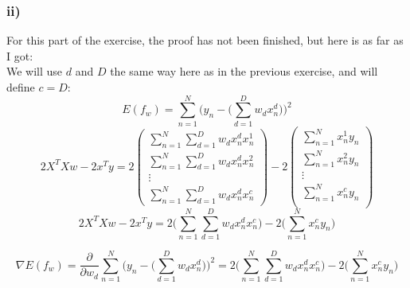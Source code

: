 \subsubsection{ii)}
For this part of the exercise, the proof has not been finished, but here is as far as I got:\\
We will use $d$ and $D$ the same way here as in the previous exercise, and will define $c = D$:
$$
E(f_w) = \sum_{n=1}^N\bigg(y_n-\Big(\sum_{d=1}^Dw_dx_n^d\Big)\bigg)^2
$$
$$
2X^TXw-2x^Ty =
2
\left(
\begin{array}{l}
\sum_{n=1}^N\sum_{d=1}^Dw_dx_n^dx_n^1 \\
\sum_{n=1}^N\sum_{d=1}^Dw_dx_n^dx_n^2 \\
\vdots \\
\sum_{n=1}^N\sum_{d=1}^Dw_dx_n^dx_n^c 
\end{array}
\right)
-2
\left(
\begin{array}{l}
\sum_{n=1}^Nx_n^1y_n \\
\sum_{n=1}^Nx_n^2y_n \\
\vdots \\
\sum_{n=1}^Nx_n^cy_n \\
\end{array}
\right)
$$
$$
2X^TXw-2x^Ty = 2\Big(\sum_{n=1}^N\sum_{d=1}^Dw_dx_n^dx_n^c\Big)-2\Big(\sum_{n=1}^Nx_n^cy_n\Big)
$$

$$
\nabla E(f_w) = \frac{\partial}{\partial w_d} \sum_{n=1}^N\bigg(y_n-\Big(\sum_{d=1}^Dw_dx_n^d\Big)\bigg)^2 = 2\Big(\sum_{n=1}^N\sum_{d=1}^Dw_dx_n^dx_n^c\Big)-2\Big(\sum_{n=1}^Nx_n^cy_n\Big)
$$




